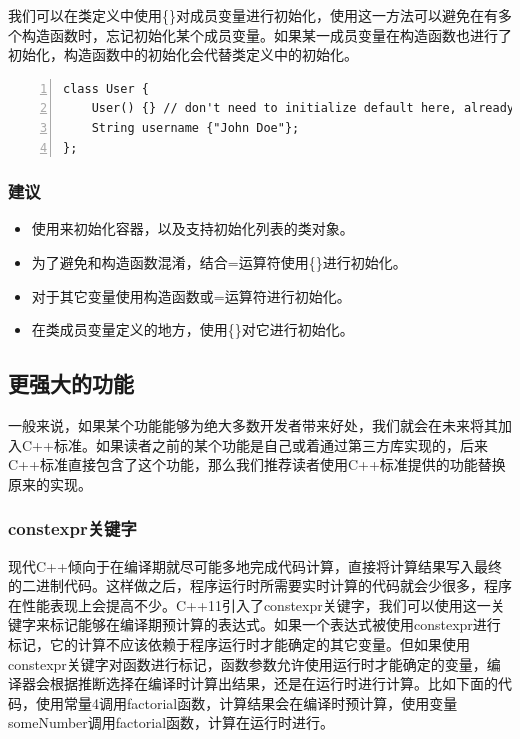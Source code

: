 \documentclass{ctexart}
\begin{document}
我们可以在类定义中使用\{\}对成员变量进行初始化，使用这一方法可以避免在有多个构造函数时，忘记初始化某个成员变量。如果某一成员变量在构造函数也进行了初始化，构造函数中的初始化会代替类定义中的初始化。

\begin{lstlisting}[language={[ANSI]C},keywordstyle=\color{blue!70},commentstyle=\color{red!50!green!50!blue!50},frame=shadowbox, rulesepcolor=\color{red!20!green!20!blue!20},basicstyle=\small,numbers=left, numberstyle=\tiny,breaklines=true]
class User {  
	User() {} // don't need to initialize default here, already done  
	String username {"John Doe"};  
};
\end{lstlisting}

\subsubsection*{建议}

\begin{itemize}
	\item 使用{}来初始化容器，以及支持初始化列表的类对象。
	\item 为了避免和构造函数混淆，结合=运算符使用\{\}进行初始化。
	\item 对于其它变量使用构造函数或=运算符进行初始化。
	\item 在类成员变量定义的地方，使用\{\}对它进行初始化。
\end{itemize}

\subsection{更强大的功能}

一般来说，如果某个功能能够为绝大多数开发者带来好处，我们就会在未来将其加入C++标准。如果读者之前的某个功能是自己或着通过第三方库实现的，后来C++标准直接包含了这个功能，那么我们推荐读者使用C++标准提供的功能替换原来的实现。

\subsubsection{constexpr关键字}

现代C++倾向于在编译期就尽可能多地完成代码计算，直接将计算结果写入最终的二进制代码。这样做之后，程序运行时所需要实时计算的代码就会少很多，程序在性能表现上会提高不少。C++11引入了constexpr关键字，我们可以使用这一关键字来标记能够在编译期预计算的表达式。如果一个表达式被使用constexpr进行标记，它的计算不应该依赖于程序运行时才能确定的其它变量。但如果使用constexpr关键字对函数进行标记，函数参数允许使用运行时才能确定的变量，编译器会根据推断选择在编译时计算出结果，还是在运行时进行计算。比如下面的代码，使用常量4调用factorial函数，计算结果会在编译时预计算，使用变量someNumber调用factorial函数，计算在运行时进行。
\end{document}

